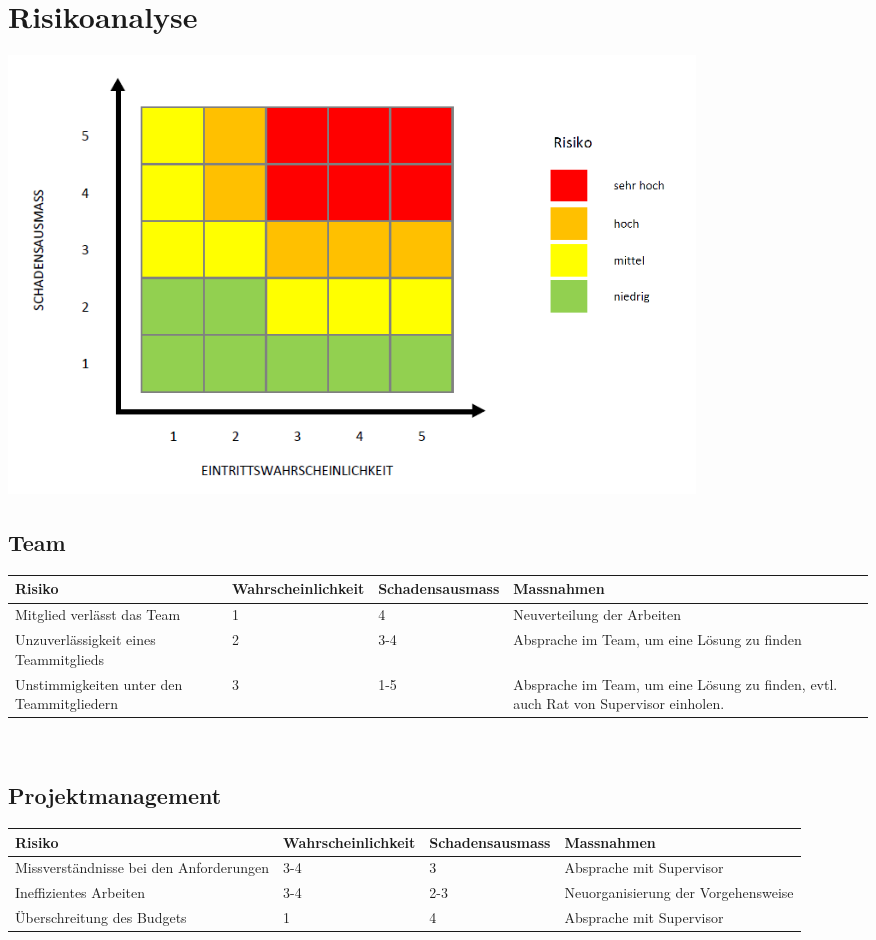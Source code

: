 \section{Risikoanalyse}

\includegraphics[width=0.8\textwidth]{Images/risikomatrix.png}

\subsection{Team}
\begin{table}[h]
\begin{tabular}{|p{3cm}|p{3cm}|p{3cm}|p{4cm}|}\hline
	
	\textbf{Risiko}	& 	\textbf{Wahrscheinlichkeit} & \textbf{Schadensausmass}  & \textbf{Massnahmen} \\\hline
	

	Mitglied verlässt das Team	&	1	&	4	&	Neuverteilung der Arbeiten \\\hline
	Unzuverlässigkeit eines Teammitglieds	&	2	&	3-4	&	 Absprache im Team, um eine Lösung zu finden  \\\hline
	Unstimmigkeiten unter den Teammitgliedern	& 	3	&	1-5	& Absprache im Team, um eine Lösung zu finden, evtl. auch Rat von Supervisor einholen.  \\\hline
\end{tabular}\\
\end{table}

\subsection{Projektmanagement}
\begin{table}[h]
\begin{tabular}{|p{3cm}|p{3cm}|p{3cm}|p{4cm}|}\hline
	
	\textbf{Risiko}	& 	\textbf{Wahrscheinlichkeit} & \textbf{Schadensausmass}  & \textbf{Massnahmen} \\\hline
		Missverständnisse bei den Anforderungen	&	3-4	&	3	& Absprache mit Supervisor  \\\hline
	Ineffizientes Arbeiten	&	3-4	&	2-3	& Neuorganisierung der Vorgehensweise  \\\hline
	
	Überschreitung des Budgets	&	1	&	4	& Absprache mit Supervisor  \\\hline
\end{tabular}\\
\end{table}

